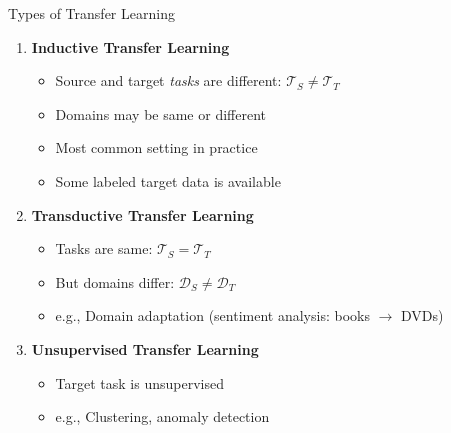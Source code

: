 \documentclass[11pt]{beamer}
\begin{document}
\begin{frame}{Types of Transfer Learning}
    \begin{enumerate}
        \item \textbf{Inductive Transfer Learning}
        \begin{itemize}
            \item Source and target \emph{tasks} are different: $\mathcal{T}_S \neq \mathcal{T}_T$
            \item Domains may be same or different
            \item Most common setting in practice
            \item Some labeled target data is available
        \end{itemize}
        \item \textbf{Transductive Transfer Learning}
        \begin{itemize}
            \item Tasks are same: $\mathcal{T}_S = \mathcal{T}_T$
            \item But domains differ: $\mathcal{D}_S \neq \mathcal{D}_T$
            \item e.g., Domain adaptation (sentiment analysis: books $\to$ DVDs)
        \end{itemize}
        \item \textbf{Unsupervised Transfer Learning}
        \begin{itemize}
            \item Target task is unsupervised
            \item e.g., Clustering, anomaly detection
        \end{itemize}
    \end{enumerate}
\end{frame}
\end{document}
